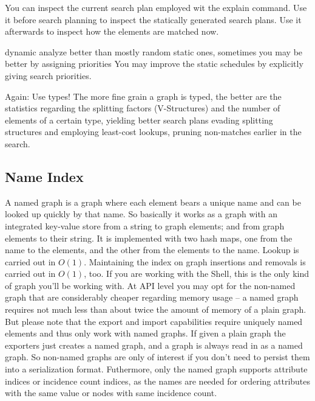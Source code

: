 You can inspect the current search plan employed wit the explain command.
Use it before search planning to inspect the statically generated search plans.
Use it afterwards to inspect how the elements are matched now.

dynamic analyze better than mostly random static ones, sometimes you may be better by assigning priorities
You may improve the static schedules by explicitly giving search priorities.

Again: Use types!
The more fine grain a graph is typed, the better are the statistics regarding the splitting factors (V-Structures) and the number of elements of a certain type, yielding better search plans evading splitting structures and employing least-cost lookups, pruning non-matches earlier in the search.

\subsection{Name Index}
A named graph is a graph where each element bears a unique name and can be looked up quickly by that name.
So basically it works as a graph with an integrated key-value store from a string to graph elements; and from graph elements to their string.
It is implemented with two hash maps, one from the name to the elements, and the other from the elements to the name.
Lookup is carried out in $O(1)$.
Maintaining the index on graph insertions and removals is carried out in $O(1)$, too.
If you are working with the Shell, this is the only kind of graph you'll be working with.
At API level you may opt for the non-named graph that are considerably cheaper regarding memory usage -- a named graph requires not much less than about twice the amount of memory of a plain graph.
But please note that the export and import capabilities require uniquely named elements and thus only work with named graphs.
If given a plain graph the exporters just creates a named graph, and a graph is always read in as a named graph.
So non-named graphs are only of interest if you don't need to persist them into a serialization format.
Futhermore, only the named graph supports attribute indices or incidence count indices, 
as the names are needed for ordering attributes with the same value or nodes with same incidence count.

